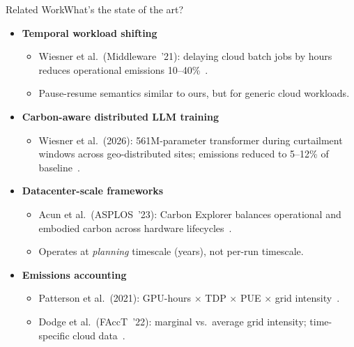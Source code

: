 \begin{frame}[t]{Related Work}{What's the state of the art?}

  \small
  \begin{itemize}
    \item \textbf{Temporal workload shifting}
      \begin{itemize}
        \item Wiesner et al.\ (Middleware~'21): delaying cloud batch jobs by hours
          reduces operational emissions 10--40\%~\cite{wiesner_lets_2021}.
        \item Pause-resume semantics similar to ours, but for generic cloud workloads.
      \end{itemize}

    \item \textbf{Carbon-aware distributed LLM training}
      \begin{itemize}
        \item Wiesner et al.\ (2026): 561M-parameter transformer during curtailment windows
          across geo-distributed sites; emissions reduced to 5--12\% of baseline~\cite{wiesner_distributed_2026}.
      \end{itemize}

    \item \textbf{Datacenter-scale frameworks}
      \begin{itemize}
        \item Acun et al.\ (ASPLOS~'23): Carbon Explorer balances operational
          and embodied carbon across hardware lifecycles~\cite{acun_carbon_2023}.
        \item Operates at \emph{planning} timescale (years), not per-run timescale.
      \end{itemize}

    \item \textbf{Emissions accounting}
      \begin{itemize}
        \item Patterson et al.\ (2021): GPU-hours $\times$ TDP $\times$ PUE $\times$ grid intensity~\cite{patterson_carbon_nodate}.
        \item Dodge et al.\ (FAccT~'22): marginal vs.\ average grid intensity;
          time-specific cloud data~\cite{dodge_measuring_2022}.
      \end{itemize}
  \end{itemize}

\end{frame}
